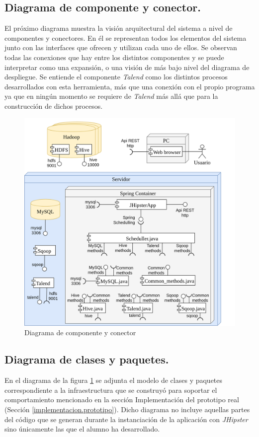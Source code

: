 \subsection{Diagrama de componente y conector.} \label{disenyo.arquitectura.cyc}
\par El próximo diagrama muestra la visión arquitectural del sistema a nivel de componentes y conectores. En él se representan todos los elementos del sistema junto con las interfaces que ofrecen y utilizan cada uno de ellos. Se observan todas las conexiones que hay entre los distintos componentes y se puede interpretar como una expansión, o una visión de más bajo nivel del diagrama de despliegue. Se entiende el componente \textit{Talend} como los distintos procesos desarrollados con esta herramienta, más que una conexión con el propio programa ya que en ningún momento se requiere de \textit{Talend} más allá que para la construcción de dichos procesos. 

\begin{figure}[H]
    \centering
    \includegraphics[width=\textwidth,height=\textheight,keepaspectratio]{Imagenes/cyc}
    \caption{Diagrama de componente y conector}
    \label{fig:diag_clases}
\end{figure}


\subsection{Diagrama de clases y paquetes.} \label{disenyo.arquitectura.clases}
 En el diagrama de la figura \ref{fig:diag_clases} se adjunta el modelo de clases y paquetes correspondiente a la infraestructura que se construyó para soportar el comportamiento mencionado en la sección Implementación del prototipo real (Sección  \ref{implementacion.prototipo}). Dicho diagrama no incluye aquellas partes del código que se generan durante la instanciación de la aplicación con \textit{JHipster} sino únicamente las que el alumno ha desarrollado. 


